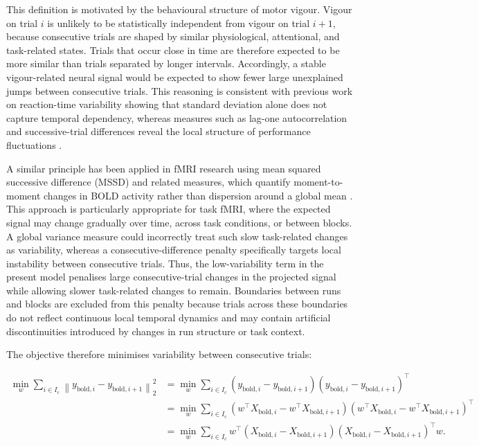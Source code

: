 \documentclass[utf8]{frontiers_suppmat}
\begin{document}
This definition is motivated by the behavioural structure of motor vigour. Vigour on trial $i$ is unlikely to be statistically independent from vigour on trial $i+1$, because consecutive trials are shaped by similar physiological, attentional, and task-related states. Trials that occur close in time are therefore expected to be more similar than trials separated by longer intervals. Accordingly, a stable vigour-related neural signal would be expected to show fewer large unexplained jumps between consecutive trials. This reasoning is consistent with previous work on reaction-time variability showing that standard deviation alone does not capture temporal dependency, whereas measures such as lag-one autocorrelation and successive-trial differences reveal the local structure of performance fluctuations \citep{perquin2023temporal}.

A similar principle has been applied in fMRI research using mean squared successive difference (MSSD) and related measures, which quantify moment-to-moment changes in BOLD activity rather than dispersion around a global mean \citep{garrett2011importance, wehrheim2024reliability, nomi2018resting}. This approach is particularly appropriate for task fMRI, where the expected signal may change gradually over time, across task conditions, or between blocks. A global variance measure could incorrectly treat such slow task-related changes as variability, whereas a consecutive-difference penalty specifically targets local instability between consecutive trials. Thus, the low-variability term in the present model penalises large consecutive-trial changes in the projected signal while allowing slower task-related changes to remain. Boundaries between runs and blocks are excluded from this penalty because trials across these boundaries do not reflect continuous local temporal dynamics and may contain artificial discontinuities introduced by changes in run structure or task context.

The objective therefore minimises variability between consecutive trials:

\begin{align}
\min_w \sum_{i\in I_c}
\left\|y_{\mathrm{bold},i}-y_{\mathrm{bold},i+1}\right\|_2^2
&=
\min_w \sum_{i\in I_c}
\left(y_{\mathrm{bold},i}-y_{\mathrm{bold},i+1}\right)
\left(y_{\mathrm{bold},i}-y_{\mathrm{bold},i+1}\right)^\top
\nonumber\\[4pt]
&=
\min_w \sum_{i\in I_c}
\left(w^\top X_{\mathrm{bold},i}-w^\top X_{\mathrm{bold},i+1}\right)
\left(w^\top X_{\mathrm{bold},i}-w^\top X_{\mathrm{bold},i+1}\right)^\top
\nonumber\\[4pt]
&=
\min_w \sum_{i\in I_c}
w^\top
\left(X_{\mathrm{bold},i}-X_{\mathrm{bold},i+1}\right)
\left(X_{\mathrm{bold},i}-X_{\mathrm{bold},i+1}\right)^\top
w.
\end{align}
\end{document}
